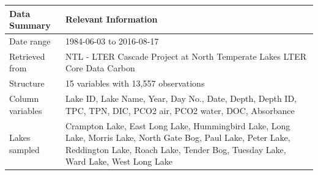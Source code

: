 \documentclass[12pt,]{article}
\begin{document}
\begin{longtable}[]{@{}ll@{}}
\toprule
\begin{minipage}[b]{0.26\columnwidth}\raggedright\strut
Data Summary\strut
\end{minipage} & \begin{minipage}[b]{0.30\columnwidth}\raggedright\strut
Relevant Information\strut
\end{minipage}\tabularnewline
\midrule
\endhead
\begin{minipage}[t]{0.26\columnwidth}\raggedright\strut
Date range\strut
\end{minipage} & \begin{minipage}[t]{0.30\columnwidth}\raggedright\strut
1984-06-03 to 2016-08-17\strut
\end{minipage}\tabularnewline
\begin{minipage}[t]{0.26\columnwidth}\raggedright\strut
Retrieved from\strut
\end{minipage} & \begin{minipage}[t]{0.30\columnwidth}\raggedright\strut
NTL - LTER Cascade Project at North Temperate Lakes LTER Core Data
Carbon\strut
\end{minipage}\tabularnewline
\begin{minipage}[t]{0.26\columnwidth}\raggedright\strut
Structure\strut
\end{minipage} & \begin{minipage}[t]{0.30\columnwidth}\raggedright\strut
15 variables with 13,557 observations\strut
\end{minipage}\tabularnewline
\begin{minipage}[t]{0.26\columnwidth}\raggedright\strut
Column variables\strut
\end{minipage} & \begin{minipage}[t]{0.30\columnwidth}\raggedright\strut
Lake ID, Lake Name, Year, Day No., Date, Depth, Depth ID, TPC, TPN, DIC,
PCO2 air, PCO2 water, DOC, Absorbance\strut
\end{minipage}\tabularnewline
\begin{minipage}[t]{0.26\columnwidth}\raggedright\strut
Lakes sampled\strut
\end{minipage} & \begin{minipage}[t]{0.30\columnwidth}\raggedright\strut
Crampton Lake, East Long Lake, Hummingbird Lake, Long Lake, Morris Lake,
North Gate Bog, Paul Lake, Peter Lake, Reddington Lake, Roach Lake,
Tender Bog, Tuesday Lake, Ward Lake, West Long Lake\strut
\end{minipage}\tabularnewline
\bottomrule
\end{longtable}
\end{document}
